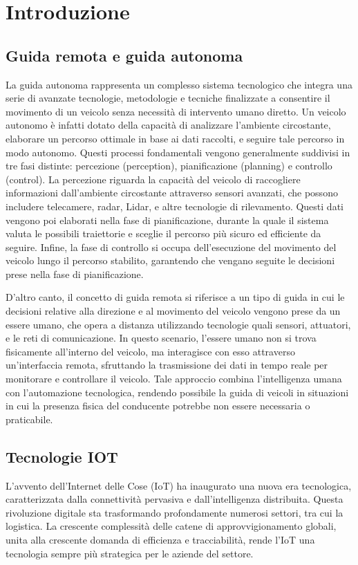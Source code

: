\section{Introduzione}
\subsection{Guida remota e guida autonoma}
La guida autonoma rappresenta un complesso sistema tecnologico che integra una serie di avanzate tecnologie, metodologie e tecniche finalizzate a consentire il movimento di un veicolo senza necessità di intervento umano diretto. Un veicolo autonomo è infatti dotato della capacità di analizzare l'ambiente circostante, elaborare un percorso ottimale in base ai dati raccolti, e seguire tale percorso in modo autonomo. Questi processi fondamentali vengono generalmente suddivisi in tre fasi distinte: percezione (perception), pianificazione (planning) e controllo (control).
La percezione riguarda la capacità del veicolo di raccogliere informazioni dall'ambiente circostante attraverso sensori avanzati, che possono includere telecamere, radar, Lidar, e altre tecnologie di rilevamento. Questi dati vengono poi elaborati nella fase di pianificazione, durante la quale il sistema valuta le possibili traiettorie e sceglie il percorso più sicuro ed efficiente da seguire. Infine, la fase di controllo si occupa dell'esecuzione del movimento del veicolo lungo il percorso stabilito, garantendo che vengano seguite le decisioni prese nella fase di pianificazione.

\noindent D'altro canto, il concetto di guida remota si riferisce a un tipo di guida in cui le decisioni relative alla direzione e al movimento del veicolo vengono prese da un essere umano, che opera a distanza utilizzando tecnologie quali sensori, attuatori, e le reti di comunicazione. In questo scenario, l'essere umano non si trova fisicamente all'interno del veicolo, ma interagisce con esso attraverso un'interfaccia remota, sfruttando la trasmissione dei dati in tempo reale per monitorare e controllare il veicolo. Tale approccio combina l'intelligenza umana con l'automazione tecnologica, rendendo possibile la guida di veicoli in situazioni in cui la presenza fisica del conducente potrebbe non essere necessaria o praticabile.

\subsection{Tecnologie IOT}
L'avvento dell'Internet delle Cose (IoT) ha inaugurato una nuova era tecnologica, caratterizzata dalla connettività pervasiva e dall'intelligenza distribuita. Questa rivoluzione digitale sta trasformando profondamente numerosi settori, tra cui la logistica. La crescente complessità delle catene di approvvigionamento globali, unita alla crescente domanda di efficienza e tracciabilità, rende l'IoT una tecnologia sempre più strategica per le aziende del settore.

